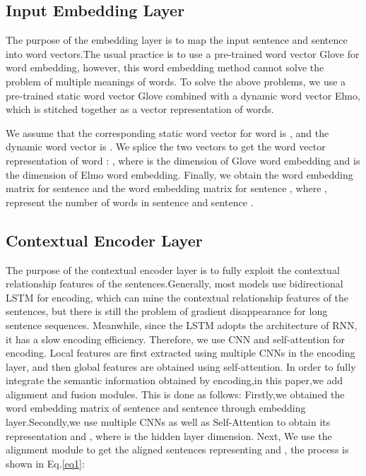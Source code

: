 \documentclass[review]{elsarticle}
\begin{document}
\subsection{Input Embedding Layer}
The purpose of the embedding layer is to map the input sentence  and sentence  into word vectors.The usual practice is to use a pre-trained word vector Glove for word embedding, however, this word embedding method cannot solve the problem of multiple meanings of words. To solve the above problems, we use a pre-trained static word vector Glove combined with a dynamic word vector Elmo, which is stitched together as a vector representation of words\cite{peters2018deep}.

We assume that the corresponding static word vector for word  is  , and the dynamic word vector is  . We splice the two vectors to get the word vector representation of word : , where   is the dimension of Glove word embedding and   is the dimension of Elmo word embedding. Finally, we obtain the word embedding matrix  for sentence  and the word embedding matrix  for sentence , where , represent the number of words in sentence  and sentence .

\subsection{Contextual Encoder Layer}
The purpose of the contextual encoder layer is to fully exploit the contextual relationship features of the sentences.Generally, most models use bidirectional LSTM for encoding\cite{wang2017bilateral}\cite{chen2017enhanced}, which can mine the contextual relationship features of the sentences, but there is still the problem of gradient disappearance for long sentence sequences. Meanwhile, since the LSTM adopts the architecture of RNN, 
it has a slow encoding efficiency. Therefore, we use CNN and self-attention for encoding. Local features are first extracted using multiple CNNs in the encoding layer, and then global features are obtained using self-attention. In order to fully integrate the semantic information obtained by encoding,in this paper,we add alignment and fusion modules. This is done as  follows: Firstly,we obtained the word embedding matrix of sentence  and sentence  through embedding layer.Secondly,we  use multiple CNNs as well as Self-Attention to obtain its representation  and  , where  is the hidden layer dimension. Next, We use the alignment module to get the aligned sentences representing  and , the process is shown in Eq.\ref{eq1}:
\end{document}
